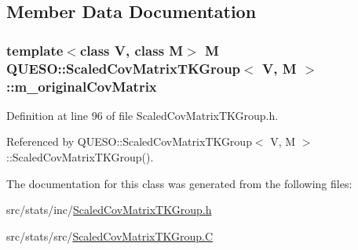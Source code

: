 \subsection{Member Data Documentation}
\hypertarget{class_q_u_e_s_o_1_1_scaled_cov_matrix_t_k_group_a57274707373f001d91695e4120cc1743}{
\subsubsection[{m\-\_\-original\-Cov\-Matrix}]{\setlength{\rightskip}{0pt plus 5cm}template$<$class V, class M$>$ M {\bf Q\-U\-E\-S\-O\-::\-Scaled\-Cov\-Matrix\-T\-K\-Group}$<$ V, M $>$\-::m\-\_\-original\-Cov\-Matrix\hspace{0.3cm}{\ttfamily [private]}}}\label{class_q_u_e_s_o_1_1_scaled_cov_matrix_t_k_group_a57274707373f001d91695e4120cc1743}


Definition at line 96 of file Scaled\-Cov\-Matrix\-T\-K\-Group.\-h.



Referenced by Q\-U\-E\-S\-O\-::\-Scaled\-Cov\-Matrix\-T\-K\-Group$<$ V, M $>$\-::\-Scaled\-Cov\-Matrix\-T\-K\-Group().



The documentation for this class was generated from the following files\-:\begin{DoxyCompactItemize}
\item 
src/stats/inc/\hyperlink{_scaled_cov_matrix_t_k_group_8h}{Scaled\-Cov\-Matrix\-T\-K\-Group.\-h}\item 
src/stats/src/\hyperlink{_scaled_cov_matrix_t_k_group_8_c}{Scaled\-Cov\-Matrix\-T\-K\-Group.\-C}\end{DoxyCompactItemize}
